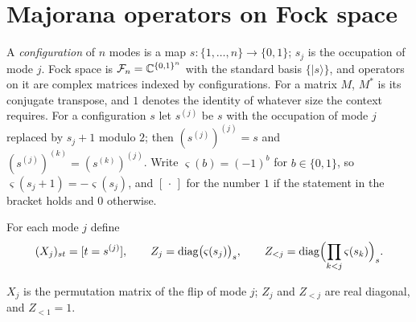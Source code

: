 \section{Majorana operators on Fock space}
\label{sec:fock}
A \emph{configuration} of $n$ modes is a map $s:\{1,\ldots,n\}\to\{0,1\}$; $s_j$ is
the occupation of mode $j$. Fock space is $\mathcal F_n=\mathbb C^{\{0,1\}^n}$ with the standard basis
$\{|s\rangle\}$, and operators on it are complex matrices indexed by configurations.
For a matrix $M$, $M^*$ is its conjugate transpose, and $1$ denotes the identity of
whatever size the context requires. For a configuration $s$ let $s^{(j)}$ be $s$
with the occupation of mode $j$ replaced by $s_j+1$ modulo $2$; then
$(s^{(j)})^{(j)}=s$ and $(s^{(j)})^{(k)}=(s^{(k)})^{(j)}$. Write $\varsigma(b)=(-1)^b$
for $b\in\{0,1\}$, so $\varsigma(s_j+1)=-\varsigma(s_j)$, and $[\,\cdot\,]$ for the number $1$ if
the statement in the bracket holds and $0$ otherwise.

\begin{definition}\label{def:pauli}
For each mode $j$ define
\[
 (X_j)_{st}=[t=s^{(j)}],\qquad
 Z_j=\operatorname{diag}\bigl(\varsigma(s_j)\bigr)_s,\qquad
 Z_{<j}=\operatorname{diag}\Bigl(\prod_{k<j}\varsigma(s_k)\Bigr)_s .
\]
\end{definition}
$X_j$ is the permutation matrix of the flip of mode $j$; $Z_j$ and $Z_{<j}$ are real
diagonal, and $Z_{<1}=1$.

